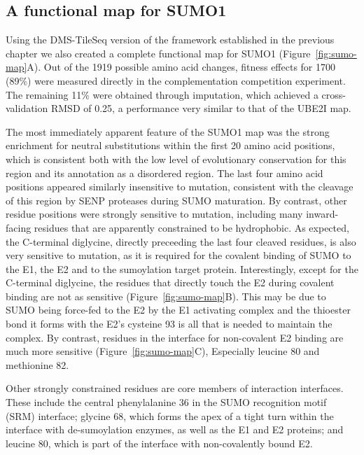 \subsection{A functional map for SUMO1}

Using the DMS-TileSeq version of the framework established in the previous chapter we also created a complete functional map for SUMO1 (Figure~\ref{fig:sumo-map}A). Out of the 1919 possible amino acid changes, fitness effects for 1700 (89\%) were measured directly in the complementation competition experiment. The remaining 11\% were obtained through imputation, which achieved a cross-validation RMSD of 0.25, a performance very similar to that of the UBE2I map.

The most immediately apparent feature of the SUMO1 map was the strong enrichment for neutral substitutions within the first 20 amino acid positions, which is consistent both with the low level of evolutionary conservation for this region and its annotation as a disordered region. The last four amino acid positions appeared similarly insensitive to mutation, consistent with the cleavage of this region by SENP proteases during SUMO maturation. By contrast, other residue positions were strongly sensitive to mutation, including many inward-facing residues that are apparently constrained to be hydrophobic. As expected, the C-terminal diglycine, directly preceeding the last four cleaved residues, is also very sensitive to mutation, as it is required for the covalent binding of SUMO to the E1, the E2 and to the sumoylation target protein. Interestingly, except for the C-terminal diglycine, the residues that directly touch the E2 during covalent binding are not as sensitive (Figure~\ref{fig:sumo-map}B). This may be due to  SUMO being force-fed to the E2 by the E1 activating complex and the thioester bond it forms with the E2's cysteine 93 is all that is needed to maintain the complex. By contrast, residues in the interface for non-covalent E2 binding are much more sensitive (Figure~\ref{fig:sumo-map}C), Especially leucine 80 and methionine 82.

Other strongly constrained residues are core members of interaction interfaces. These include the central phenylalanine 36 in the SUMO recognition motif (SRM) interface; glycine 68, which forms the apex of a tight turn within the interface with de-sumoylation enzymes, as well as the E1 and E2 proteins; and leucine 80, which is part of the interface with non-covalently bound E2. 

